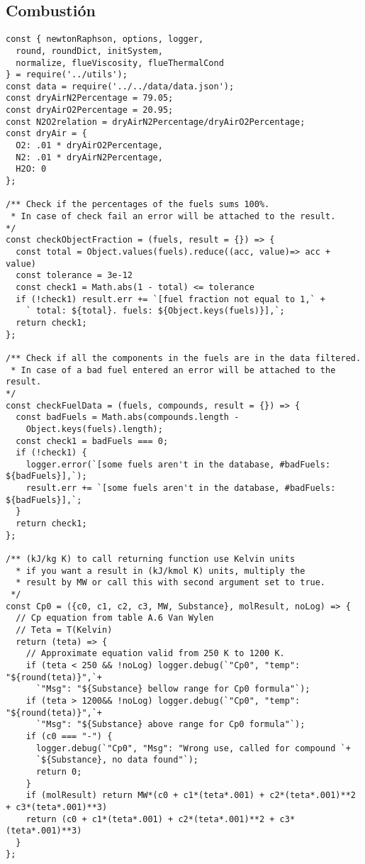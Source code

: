 \subsection{Combustión}
\begin{verbatim}
const { newtonRaphson, options, logger,
  round, roundDict, initSystem,
  normalize, flueViscosity, flueThermalCond
} = require('../utils');
const data = require('../../data/data.json');
const dryAirN2Percentage = 79.05;
const dryAirO2Percentage = 20.95;
const N2O2relation = dryAirN2Percentage/dryAirO2Percentage;
const dryAir = {
  O2: .01 * dryAirO2Percentage,
  N2: .01 * dryAirN2Percentage,
  H2O: 0
};

/** Check if the percentages of the fuels sums 100%.
 * In case of check fail an error will be attached to the result.
*/
const checkObjectFraction = (fuels, result = {}) => {
  const total = Object.values(fuels).reduce((acc, value)=> acc + value)
  const tolerance = 3e-12
  const check1 = Math.abs(1 - total) <= tolerance
  if (!check1) result.err += `[fuel fraction not equal to 1,` + 
    ` total: ${total}. fuels: ${Object.keys(fuels)}],`;
  return check1;
};

/** Check if all the components in the fuels are in the data filtered.
 * In case of a bad fuel entered an error will be attached to the result.
*/
const checkFuelData = (fuels, compounds, result = {}) => {
  const badFuels = Math.abs(compounds.length - 
    Object.keys(fuels).length);
  const check1 = badFuels === 0;
  if (!check1) {
    logger.error(`[some fuels aren't in the database, #badFuels: ${badFuels}],`);
    result.err += `[some fuels aren't in the database, #badFuels: ${badFuels}],`;
  }
  return check1;
};

/** (kJ/kg K) to call returning function use Kelvin units 
  * if you want a result in (kJ/kmol K) units, multiply the
  * result by MW or call this with second argument set to true.
 */
const Cp0 = ({c0, c1, c2, c3, MW, Substance}, molResult, noLog) => {
  // Cp equation from table A.6 Van Wylen
  // Teta = T(Kelvin)
  return (teta) => {
    // Approximate equation valid from 250 K to 1200 K.
    if (teta < 250 && !noLog) logger.debug(`"Cp0", "temp": "${round(teta)}",`+
      `"Msg": "${Substance} bellow range for Cp0 formula"`);
    if (teta > 1200&& !noLog) logger.debug(`"Cp0", "temp": "${round(teta)}",`+
      `"Msg": "${Substance} above range for Cp0 formula"`);
    if (c0 === "-") {
      logger.debug(`"Cp0", "Msg": "Wrong use, called for compound `+
      `${Substance}, no data found"`);
      return 0;
    }
    if (molResult) return MW*(c0 + c1*(teta*.001) + c2*(teta*.001)**2 + c3*(teta*.001)**3)
    return (c0 + c1*(teta*.001) + c2*(teta*.001)**2 + c3*(teta*.001)**3)
  }
};


\end{verbatim}
